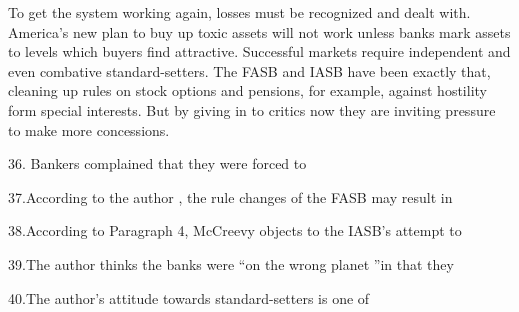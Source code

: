 \qquad To get the system working again, losses must be recognized and dealt with. America's new plan to buy up toxic assets will not work unless banks mark assets to levels which buyers find attractive. Successful markets require independent and even combative standard-setters. The FASB and IASB have been exactly that, cleaning up rules on stock options and pensions, for example, against hostility form special interests. But by giving in to critics now they are inviting pressure to make more concessions.

36. Bankers complained that they were forced to\par

37.According to the author , the rule changes of the FASB may result in\par

38.According to Paragraph 4, McCreevy objects to the IASB’s attempt to\par

39.The author thinks the banks were “on the wrong planet ”in that they\par

40.The author’s attitude towards standard-setters is one of\par
